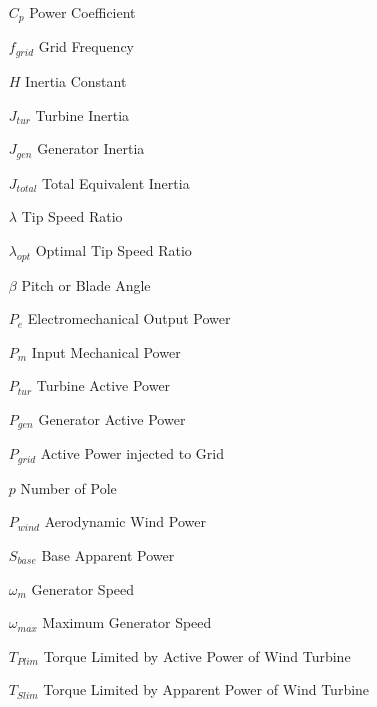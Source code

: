 
\begin{theglossary}{}
	
	\begin{itemize}[leftmargin=4.5em,align=parleft,labelsep=1cm]
		
		\item[$C_{p}$] 			Power Coefficient
		\item[$f_{grid}$] 		Grid Frequency
		\item[$H$] 				Inertia Constant
		\item[$J_{tur}$] 		Turbine Inertia
		\item[$J_{gen}$] 		Generator Inertia
		\item[$J_{total}$] 		Total Equivalent Inertia		\item[$\lambda$] 		Tip Speed Ratio
		\item[$\lambda_{opt}$]	Optimal Tip Speed Ratio
		\item[$\beta$]			Pitch or Blade Angle
		\item[$P_{e}$] 			Electromechanical Output Power
		\item[$P_{m}$] 			Input Mechanical Power
		\item[$P_{tur}$] 		Turbine Active Power
		\item[$P_{gen}$] 		Generator Active Power
		\item[$P_{grid}$] 		Active Power injected to Grid
		\item[$p$] 				Number of Pole
		\item[$P_{wind}$] 		Aerodynamic Wind Power
		\item[$S_{base}$] 		Base Apparent Power
		\item[$\omega_{m}$] 	Generator Speed
		\item[$\omega_{max}$] 	Maximum Generator Speed
		\item[$T_{Plim}$]		Torque Limited by Active Power of Wind Turbine
		\item[$T_{Slim}$] 		Torque Limited by Apparent Power of Wind Turbine
	\end{itemize}
	
\end{theglossary}